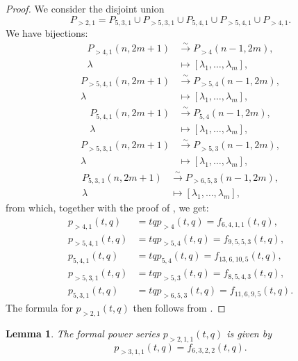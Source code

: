 \documentclass[a4paper, 12pt, reqno]{amsart}
\newtheorem{lemma}[theorem]{Lemma}
\theoremstyle{remark}
\begin{document}
\begin{proof}
  We consider the disjoint union
  \begin{equation*}
    P_{>2, 1} = P_{5, 3, 1} \cup P_{>5, 3, 1} \cup P_{5, 4, 1} \cup P_{>5, 4, 1} \cup P_{>4, 1}.
  \end{equation*}
  We have bijections:
  \begin{align*}
    P_{>4, 1}(n, 2m + 1) &\xrightarrow{\sim} P_{>4}(n - 1, 2m), \\
    \lambda &\mapsto [\lambda_1, \dots, \lambda_m],
  \end{align*}
  \begin{align*}
    P_{>5, 4, 1}(n, 2m + 1) &\xrightarrow{\sim} P_{>5, 4}(n - 1, 2m), \\
    \lambda &\mapsto [\lambda_1, \dots, \lambda_m],
  \end{align*}
  \begin{align*}
    P_{5, 4, 1}(n, 2m + 1) &\xrightarrow{\sim} P_{5, 4}(n - 1, 2m), \\
    \lambda &\mapsto [\lambda_1, \dots, \lambda_m],
  \end{align*}
  \begin{align*}
    P_{>5, 3, 1}(n, 2m + 1) &\xrightarrow{\sim} P_{>5, 3}(n - 1, 2m), \\
    \lambda &\mapsto [\lambda_1, \dots, \lambda_m],
  \end{align*}
  \begin{align*}
    P_{5, 3, 1}(n, 2m + 1) &\xrightarrow{\sim} P_{>6, 5, 3}(n - 1, 2m), \\
    \lambda &\mapsto [\lambda_1, \dots, \lambda_m],
  \end{align*}
  from which, together with the proof of , we get:
  \begin{align*}
    p_{>4, 1}(t, q) &= tqp_{>4}(t, q) = f_{6, 4, 1, 1}(t, q), \\
    p_{>5, 4, 1}(t, q) &= tqp_{>5, 4}(t, q) = f_{9, 5, 5, 3}(t, q), \\
    p_{5, 4, 1}(t, q) &= tqp_{5, 4}(t, q) = f_{13, 6, 10, 5}(t, q), \\
    p_{>5, 3, 1}(t, q) &= tqp_{>5, 3}(t, q) = f_{8, 5, 4, 3}(t, q), \\
    p_{5, 3, 1}(t, q) &= tqp_{>6, 5, 3}(t, q) = f_{11, 6, 9, 5}(t, q).
  \end{align*}
  The formula for $p_{>2, 1}(t, q)$ then follows from .
\end{proof}

\begin{lemma}
  \label{lmm:32}
  The formal power series $p_{>2, 1, 1}(t, q)$ is given by
  \begin{equation*}
    p_{>3, 1, 1}(t, q) = f_{6, 3, 2, 2}(t, q).
  \end{equation*}
\end{lemma}
\end{document}
